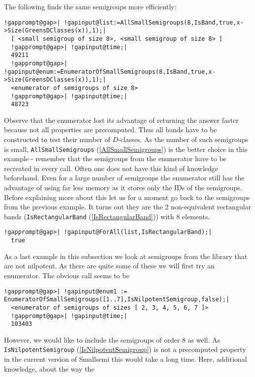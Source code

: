 \documentclass[a4paper,11pt]{report}
\begin{document}
{{{ The following finds the same semigroups more efficiently: 
\begin{Verbatim}[commandchars=!@|,fontsize=\small,frame=single,label=Example]
  !gapprompt@gap>| !gapinput@list:=AllSmallSemigroups(8,IsBand,true,x->Size(GreensDClasses(x)),1);|
  [ <small semigroup of size 8>, <small semigroup of size 8> ]
  !gapprompt@gap>| !gapinput@time;|
  49211
  !gapprompt@gap>| !gapinput@enum:=EnumeratorOfSmallSemigroups(8,IsBand,true,x->Size(GreensDClasses(x)),1);|
  <enumerator of semigroups of size 8>
  !gapprompt@gap>| !gapinput@time;|
  48723
\end{Verbatim}
 Observe that the enumerator lost its advantage of returning the answer faster
because not all properties are precomputed. Thus all bands have to be
constructed to test their number of $D$-classes. As the number of such semigroups is small, \texttt{AllSmallSemigroups} (\ref{AllSmallSemigroups}) is the better choice in this example - remember that the semigroups from the
enumerator have to be recreated in every call. Often one does not have this
kind of knowledge beforehand. Even for a large number of semigroups the
enumerator still has the advantage of using far less memory as it stores only
the IDs of the semigroups. Before explaining more about this let us for a
moment go back to the semigroups from the previous example. It turns out they
are the 2 non-equivalent rectangular bands (\texttt{IsRectangularBand} (\ref{IsRectangularBand})) with 8 elements. 
\begin{Verbatim}[commandchars=!@|,fontsize=\small,frame=single,label=Example]
  !gapprompt@gap>| !gapinput@ForAll(list,IsRectangularBand);|
  true
\end{Verbatim}
  As a last example in this subsection we look at semigroups from the library
that are not nilpotent. As there are quite some of these we will first try an
enumerator. The obvious call seems to be 
\begin{Verbatim}[commandchars=!@|,fontsize=\small,frame=single,label=Example]
  !gapprompt@gap>| !gapinput@enum1 := EnumeratorOfSmallSemigroups([1..7],IsNilpotentSemigroup,false);|
  <enumerator of semigroups of sizes [ 2, 3, 4, 5, 6, 7 ]>
  !gapprompt@gap>| !gapinput@time;|
  103403
\end{Verbatim}
 However, we would like to include the semigroups of order 8 as well. As \texttt{IsNilpotentSemigroup} (\ref{IsNilpotentSemigroup}) is not a precomputed property in the current version of \textsf{Smallsemi} this would take a long time. Here, additional knowledge, about the way the
}}}
\end{document}
